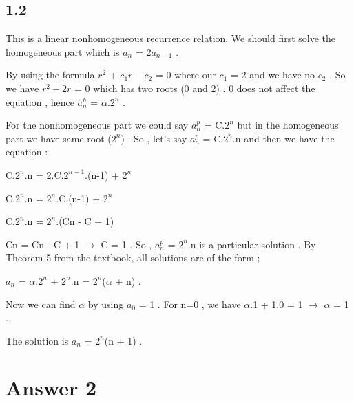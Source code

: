 \documentclass[12pt]{article}
\begin{document}
\subsection*{1.2}
\hspace{15px} This is a linear nonhomogeneous recurrence relation. We should first solve the homogeneous part which is \textit{$a_n$} = \textit{$2a_{n-1}$} . \par 
By using the formula \textit{$r^{2}$} + \textit{$c_1r - c_2$} = 0 where our \textit{$c_1$} = 2 and we have no \textit{$c_2$} . So we have \textit{$r^{2} - 2r$} = 0 which has two roots (0 and 2) . 0 does not affect the equation , hence \textit{$a_n^h$} = $\alpha$.\textit{$2^{n}$} . \par 
For the nonhomogeneous part we could say \textit{$a_n^p$} = C.\textit{$2^{n}$} but in the homogeneous part we have same root (\textit{$2^{n}$}) . So , let's say \textit{$a_n^p$} = C.\textit{$2^{n}$}.n and then we have the equation : \par 
C.\textit{$2^{n}$}.n = 2.C.\textit{$2^{n-1}$}.(n-1) + \textit{$2^n$} \par 
C.\textit{$2^{n}$}.n = \textit{$2^n$}.C.(n-1) + \textit{$2^n$} \par 
C.\textit{$2^{n}$}.n = \textit{$2^n$}.(Cn - C + 1) \par 
Cn = Cn - C + 1 $\rightarrow$ C = 1 . So , \textit{$a_n^p$} = \textit{$2^n$}.n is a particular solution . By Theorem 5 from the textbook, all solutions are of the form ; \par 
\textit{$a_n$} = $\alpha$.\textit{$2^n$} + \textit{$2^n$}.n = \textit{$2^n$}($\alpha$ + n) . \par 
Now we can find $\alpha$ by using \textit{$a_0$} = 1 . For n=0 , we have $\alpha$.1 + 1.0 = 1  $\rightarrow$ $\alpha$ = 1 . \par 
The solution is \textit{$a_n$} = \textit{$2^n$}(n + 1) .


\section*{Answer 2}
\end{document}
